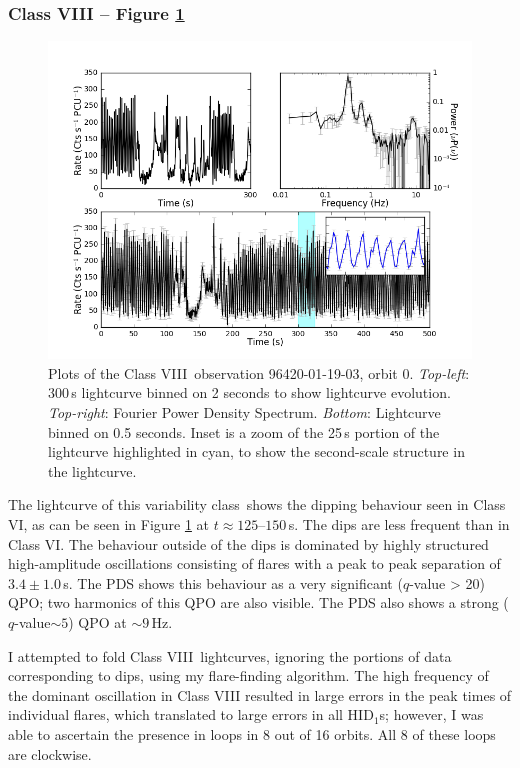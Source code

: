 \subsubsection{Class VIII -- Figure \ref{fig:Omulti}}

\begin{figure}
    \includegraphics[width=0.8\columnwidth, trim = 0.6cm 0 3.9cm 0]{images/Omulti.png}
    \captionsetup{singlelinecheck=off}
    \caption[Characteristic lightcurves and a power spectrum of Type VIII variability.]{Plots of the Class VIII\indexviii\ observation 96420-01-19-03, orbit 0.  \textit{Top-left}: 300\,s lightcurve binned on 2 seconds to show lightcurve evolution.  \textit{Top-right}: Fourier Power Density Spectrum.  \textit{Bottom}: Lightcurve binned on 0.5 seconds.  Inset is a zoom of the 25\,s portion of the lightcurve highlighted in cyan, to show the second-scale structure in the lightcurve.}
   \label{fig:Omulti}
\end{figure}

\par The lightcurve of this variability class\indexviii\ shows the dipping behaviour seen in Class VI\indexvi, as can be seen in Figure \ref{fig:Omulti} at $t\approx125$--$150$\,s.  The dips are less frequent than in Class VI.  The behaviour outside of the dips is dominated by highly structured high-amplitude oscillations consisting of flares with a peak to peak separation of $3.4\pm1.0$\,s.  The PDS shows this behaviour as a very significant ($q$-value > 20\indexq) QPO; two harmonics of this QPO are also visible.  The PDS also shows a strong ($q$-value$\sim5$\indexq) QPO at $\sim9$\,Hz.
\par I attempted to fold Class VIII\indexviii\ lightcurves, ignoring the portions of data corresponding to dips, using my flare-finding algorithm.  The high frequency of the dominant oscillation in Class VIII resulted in large errors in the peak times of individual flares, which translated to large errors in all HID$_1$s; however, I was able to ascertain the presence in loops in 8 out of 16 orbits.  All 8 of these loops are clockwise.

